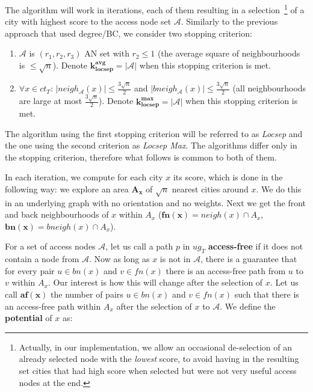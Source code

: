 		The algorithm will work in iterations, each of them resulting in a selection~\footnote{Actually, in our implementation, we allow an occasional de-selection of an already selected node with the \textit{lowest} score, to avoid having in the resulting set cities that had high score when selected but were not very useful access nodes at the end.} of a city with highest score to the access node set $\mathcal{A}$. Similarly to the previous approach that used degree/BC, we consider two stopping criterion:
		\begin{enumerate}
			\item $\mathcal{A}$ is $(r_{1}, r_{2}, r_{3})$ AN set with $r_{2} \leq 1$ (the average square of neighbourhoods is $\leq \sqrt{n}$). Denote $\bm{k_{locsep}^{avg}} = |\mathcal{A}|$ when this stopping criterion is met.
			\item $\forall x \in ct_{T}$: $|neigh_{\mathcal{A}}(x)| \leq \frac{3\sqrt{n}}{2}$ and $|bneigh_{\mathcal{A}}(x)| \leq \frac{3\sqrt{n}}{2}$ (all neighbourhoods are large at most $\frac{3\sqrt{n}}{2}$). Denote $\bm{k_{locsep}^{max}} = |\mathcal{A}|$ when this stopping criterion is met.
		\end{enumerate}
		\hspace{\fill}
		
		\noindent The algorithm using the first stopping criterion will be referred to as \textit{Locsep} and the one using the second criterion as \textit{Locsep Max}. The algorithms differ only in the stopping criterion, therefore what follows is common to both of them.
		
		In each iteration, we compute for each city $x$ its score, which is done in the following way: we explore an area $\bm{A_{x}}$ of $\sqrt{n}$ nearest cities around $x$. We do this in an underlying graph with no orientation and no weights. Next we get the front and back neighbourhoods of $x$ within $A_{x}$ ($\bm{fn(x)} = neigh(x) \cap A_{x}$, $\bm{bn(x)} = bneigh(x) \cap A_{x}$).
		
		For a set of access nodes $\mathcal{A}$, let us call a path $p$ in $ug_{T}$ \textbf{access-free} if it does not contain a node from $\mathcal{A}$. Now as long as $x$ is not in $\mathcal{A}$, there is a guarantee that for every pair $u \in bn(x)$ and $v \in fn(x)$ there is an access-free path from $u$ to $v$ within $A_{x}$. Our interest is how this will change after the selection of $x$. Let us call $\bm{af(x)}$ the number of pairs $u \in bn(x)$ and $v \in fn(x)$ such that there is an access-free path within $A_{x}$ after the selection of $x$ to $\mathcal{A}$. We define the \textbf{potential} of $x$ as:
		
